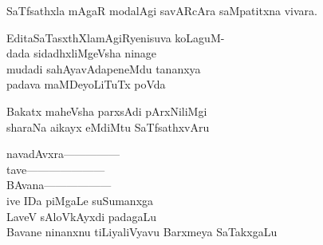 \begin{entry}
\gl{}
\begin{shl}
SaTfsathxla mAgaR modalAgi savARcAra saMpatitxna vivara.
\end{shl}
\end{entry}

\begin{entry}
\begin{shl}
EditaSaTasxthXlamAgiRyenisuva koLaguM-\\
dada sidadhxliMgeVsha ninage\\
mudadi sahAyavAdapeneMdu tananxya\\
padava maMDeyoLiTuTx poVda
\end{shl}
\end{entry}

\begin{entry}
\gl{}
\begin{shl}
Bakatx maheVsha parxsAdi pArxNiliMgi\\
sharaNa aikayx eMdiMtu SaTfsathxvAru
\end{shl}
\end{entry}

\begin{entry}
\end{entry}

\begin{entry}
\end{entry}

\begin{entry}
\mng{}
\end{entry}

\begin{entry}
\begin{shl}
navadAvxra---------------\\
tave---------------------\\
BAvana------------------\\
ive IDa piMgaLe suSumanxga\\
LaveV sAloVkAyxdi padagaLu\\
Bavane ninanxnu tiLiyaliVyavu Barxmeya SaTakxgaLu
\end{shl}
\end{entry}

